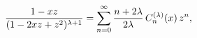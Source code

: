 \[\frac{1-xz}{(1-2xz+z^{2})^{\lambda+1}}=\sum_{n=0}^{\infty}\frac{n+2\lambda}{2%
\lambda}\mathop{C^{(\lambda)}_{n}\/}\nolimits\!\left(x\right)z^{n},\]